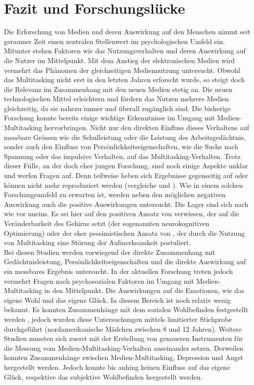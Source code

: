\section{Fazit und Forschungslücke}\label{section.fazitLücke}
Die Erforschung von Medien und deren Auswirkung auf den Menschen nimmt seit geraumer Zeit einen zentralen Stellenwert im psychologischen Umfeld ein. Mitunter stehen Faktoren wie das Nutzungsverhalten und deren Auswirkung auf die Nutzer im Mittelpunkt. Mit dem Anstieg der elektronischen Medien wird vermehrt das Phänomen der gleichzeitigen Mediennutzung untersucht. Obwohl das Multitasking nicht erst in den letzten Jahren erforscht wurde, so steigt doch die Relevanz im Zusammenhang mit den neuen Medien stetig an. Die neuen technologischen Mittel erleichtern und fördern das Nutzen mehrere Medien gleichzeitig, da sie nahezu immer und überall zugänglich sind. Die bisherige Forschung konnte bereits einige wichtige Erkenntnisse im Umgang mit Medien-Multitasking hervorbringen. Nicht nur den direkten Einfluss dieses Verhaltens auf messbare Grössen wie die Schulleistung oder die Leistung des Arbeitsgedächtnis, sonder auch den Einfluss von Persönlichkeitseigenschaften, wie die Suche nach Spannung oder das impulsive Verhalten, auf das Multitasking-Verhalten. Trotz dieser Fülle, an der doch eher jungen Forschung, sind noch einige Aspekte unklar und werfen Fragen auf. Denn teilweise heben sich Ergebnisse gegenseitig auf oder können nicht mehr reproduziert werden (vergleiche  und ). Wie in einem solchen Forschungsumfeld zu erwarten ist, werden neben den möglichen negativen Auswirkung auch die positive Auswirkungen untersucht. Die Lager sind sich nach wie vor uneins. Es sei hier auf den positiven Ansatz von  verwiesen, der auf die Veränderbarkeit des Gehirns setzt (der sogenannten neurokognitiven Optimierung) oder der eher pessimistischen Ansatz von , der durch die Nutzung von Multitasking eine Störung der Aufmerksamkeit postuliert. \\
Bei diesen Studien werden vorwiegend der direkte Zusammenhang mit Gedächtnisleistung, Persönlichkeitseigenschaften und die direkte Auswirkung auf ein messbares Ergebnis untersucht. In der aktuellen Forschung treten jedoch vermehrt Fragen nach psychosozialen Faktoren im Umgang mit Medien-Multitasking in den Mittelpunkt. Die Auswirkungen auf die Emotionen, wie das eigene Wohl und das eigene Glück. In diesem Bereich ist noch relativ wenig bekannt. Es konnten Zusammenhänge mit dem sozialen Wohlbefinden festgestellt werden , jedoch wurden diese Untersuchungen mittels limitierter Stichprobe durchgeführt (nordamerikanische Mädchen zwischen 8 und 12 Jahren). Weitere Studien mussten sich zuerst mit der Erstellung von genaueren Instrumenten für die Messung vom Medien-Multitasking-Verhalten auseinander setzen. Derweilen konnten Zusammenhänge zwischen Medien-Multitasking, Depression und Angst hergestellt werden. Jedoch konnte bis anhing keinen  Einfluss auf das eigene Glück, respektive das subjektive Wohlbefinden hergestellt werden.\\ 
